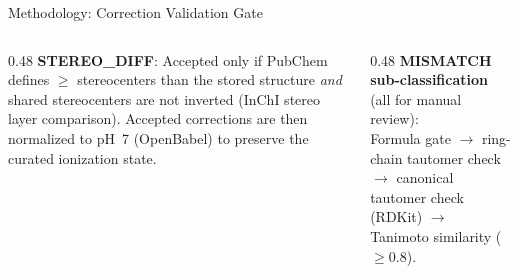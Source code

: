 \documentclass[aspectratio=169,11pt]{beamer}
\begin{document}
\begin{frame}{Methodology: Correction Validation Gate}
\smallskip
\begin{columns}[T]
\begin{column}{0.48\textwidth}
\footnotesize
\textbf{STEREO\_DIFF}: Accepted only if PubChem defines $\geq$ stereocenters
than the stored structure \textit{and} shared stereocenters are not inverted
(InChI stereo layer comparison). Accepted corrections are then normalized
to pH~7 (OpenBabel) to preserve the curated ionization state.
\end{column}
\begin{column}{0.48\textwidth}
\footnotesize
\textbf{MISMATCH sub-classification} (all for manual review):\\
Formula gate $\to$ ring-chain tautomer check $\to$ canonical tautomer
check (RDKit) $\to$ Tanimoto similarity ($\geq 0.8$).
\end{column}
\end{columns}

\end{frame}
\end{document}
